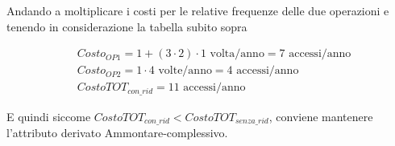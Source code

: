 Andando a moltiplicare i costi per le relative frequenze delle due operazioni e tenendo in considerazione la tabella subito sopra

\begin{samepage}
    \begin{align*}
        &Costo_{OP1} = 1 + (3 \cdot 2) \cdot 1 \text{ volta/anno} = 7 \text{ accessi/anno} \\
        &Costo_{OP2} = 1 \cdot 4 \text{ volte/anno} = 4 \text{ accessi/anno} \\
        &CostoTOT_{con\_rid} = 11 \text{ accessi/anno}
    \end{align*}
\end{samepage}

E quindi siccome \( CostoTOT_{con\_rid} < CostoTOT_{senza\_rid} \), conviene mantenere l'attributo derivato Ammontare-complessivo.

